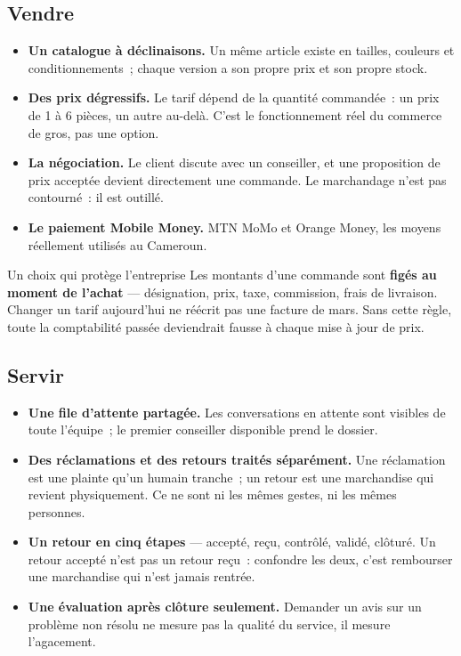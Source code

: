 \documentclass[11pt,a4paper]{article}
\begin{document}
\subsection{Vendre}

\begin{itemize}
  \item \textbf{Un catalogue à déclinaisons.} Un même article existe en
        tailles, couleurs et conditionnements~; chaque version a son propre
        prix et son propre stock.
  \item \textbf{Des prix dégressifs.} Le tarif dépend de la quantité commandée~:
        un prix de 1 à 6 pièces, un autre au-delà. C'est le fonctionnement
        réel du commerce de gros, pas une option.
  \item \textbf{La négociation.} Le client discute avec un conseiller, et une
        proposition de prix acceptée devient directement une commande. Le
        marchandage n'est pas contourné~: il est outillé.
  \item \textbf{Le paiement Mobile Money.} MTN MoMo et Orange Money, les
        moyens réellement utilisés au Cameroun.
\end{itemize}

\begin{encadre}{Un choix qui protège l'entreprise}
Les montants d'une commande sont \textbf{figés au moment de l'achat} —
désignation, prix, taxe, commission, frais de livraison. Changer un tarif
aujourd'hui ne réécrit pas une facture de mars. Sans cette règle, toute la
comptabilité passée deviendrait fausse à chaque mise à jour de prix.
\end{encadre}

\subsection{Servir}

\begin{itemize}
  \item \textbf{Une file d'attente partagée.} Les conversations en attente sont
        visibles de toute l'équipe~; le premier conseiller disponible prend le
        dossier.
  \item \textbf{Des réclamations et des retours traités séparément.} Une
        réclamation est une plainte qu'un humain tranche~; un retour est une
        marchandise qui revient physiquement. Ce ne sont ni les mêmes gestes,
        ni les mêmes personnes.
  \item \textbf{Un retour en cinq étapes} — accepté, reçu, contrôlé, validé,
        clôturé. Un retour accepté n'est pas un retour reçu~: confondre les
        deux, c'est rembourser une marchandise qui n'est jamais rentrée.
  \item \textbf{Une évaluation après clôture seulement.} Demander un avis sur
        un problème non résolu ne mesure pas la qualité du service, il mesure
        l'agacement.
\end{itemize}
\end{document}
